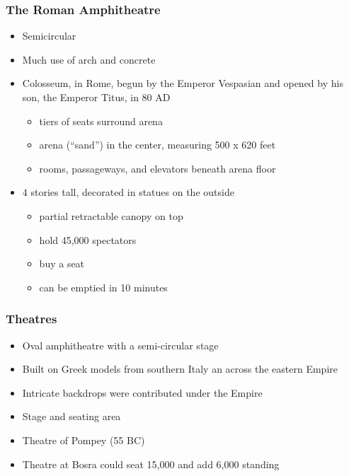 \documentclass[12pt, twoside]{article}
\begin{document}
\subsubsection{The Roman Amphitheatre}
\begin{itemize}
\item Semicircular
\item Much use of arch and concrete
\item Colosseum, in Rome, begun by the Emperor Vespasian and opened by his son, the Emperor Titus, in 80 AD
	\begin{itemize}
	\item tiers of seats surround arena
	\item arena (“sand”) in the center, measuring 500 x 620 feet
	\item rooms, passageways, and elevators beneath arena floor
	\end{itemize}
\item 4 stories tall, decorated in statues on the outside
	\begin{itemize}
	\item partial retractable canopy on top
	\item hold 45,000 spectators
	\item buy a seat
	\item can be emptied in 10 minutes
	\end{itemize}
\end{itemize}

\subsubsection{Theatres}
\begin{itemize}
\item Oval amphitheatre with a semi-circular stage
\item Built on Greek models from southern Italy an across the eastern Empire
\item Intricate backdrops were contributed under the Empire
\item Stage and seating area
\item Theatre of Pompey (55 BC)
\item Theatre at Bosra could seat 15,000 and add 6,000 standing
\end{itemize}
\end{document}
